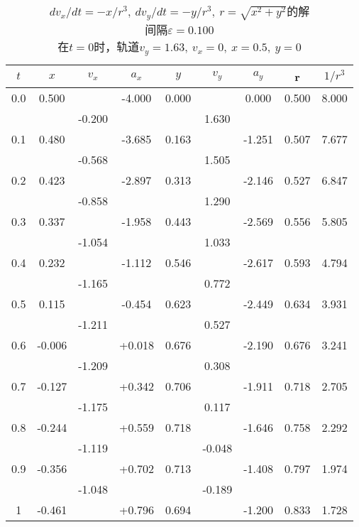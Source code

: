 \begin{longtable}{|c|c|c|c|c|c|c|c|c|}
    \caption{$dv_x/dt=-x/r^3,~dv_y/dt=-y/r^3,~r=\sqrt{x^2+y^2}$的解 \\ 间隔$\varepsilon =0.100$ \\ 在$t=0$时，轨道$v_y=1.63,~v_x=0,~x=0.5,~y=0$} \label{Table:9:2} \\
    \hline
    $t$ & $x$ & $v_x$ & $a_x$ & $y$ & $v_y$ & $a_y$ & r & $1/r^3$ \\ \hline
    0.0 & 0.500 & ~ & -4.000 & 0.000 & ~ & 0.000 & 0.500 & 8.000 \\ 
    ~ & ~ & -0.200 & ~ & ~ & 1.630 & ~ & ~ & ~ \\ 
    0.1 & 0.480 & ~ & -3.685 & 0.163 & ~ & -1.251 & 0.507 & 7.677 \\ 
    ~ & ~ & -0.568 & ~ & ~ & 1.505 & ~ & ~ & ~ \\ 
    0.2 & 0.423 & ~ & -2.897 & 0.313 & ~ & -2.146 & 0.527 & 6.847 \\ 
    ~ & ~ & -0.858 & ~ & ~ & 1.290 & ~ & ~ & ~ \\ 
    0.3 & 0.337 & ~ & -1.958 & 0.443 & ~ & -2.569 & 0.556 & 5.805 \\ 
    ~ & ~ & -1.054 & ~ & ~ & 1.033 & ~ & ~ & ~ \\ 
    0.4 & 0.232 & ~ & -1.112 & 0.546 & ~ & -2.617 & 0.593 & 4.794 \\ 
    ~ & ~ & -1.165 & ~ & ~ & 0.772 & ~ & ~ & ~ \\ 
    0.5 & 0.115 & ~ & -0.454 & 0.623 & ~ & -2.449 & 0.634 & 3.931 \\ 
    ~ & ~ & -1.211 & ~ & ~ & 0.527 & ~ & ~ & ~ \\ 
    0.6 & -0.006 & ~ & +0.018 & 0.676 & ~ & -2.190 & 0.676 & 3.241 \\ 
    ~ & ~ & -1.209 & ~ & ~ & 0.308 & ~ & ~ & ~ \\ 
    0.7 & -0.127 & ~ & +0.342 & 0.706 & ~ & -1.911 & 0.718 & 2.705 \\ 
    ~ & ~ & -1.175 & ~ & ~ & 0.117 & ~ & ~ & ~ \\ 
    0.8 & -0.244 & ~ & +0.559 & 0.718 & ~ & -1.646 & 0.758 & 2.292 \\ 
    ~ & ~ & -1.119 & ~ & ~ & -0.048 & ~ & ~ & ~ \\ 
    0.9 & -0.356 & ~ & +0.702 & 0.713 & ~ & -1.408 & 0.797 & 1.974 \\ 
    ~ & ~ & -1.048 & ~ & ~ & -0.189 & ~ & ~ & ~ \\ 
    1 & -0.461 & ~ & +0.796 & 0.694 & ~ & -1.200 & 0.833 & 1.728 \\ 

\end{longtable}
